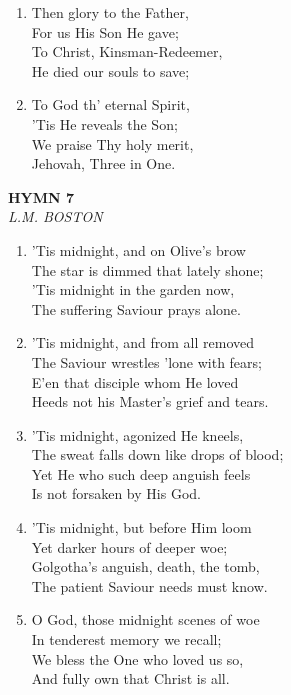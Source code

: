 \documentclass[11pt,a4paper]{article}
\begin{document}
\begin{enumerate}
    \item Then glory to the Father, \\
        For us His Son He gave; \\
        To Christ, Kinsman-Redeemer, \\
        He died our souls to save;

    \item To God th' eternal Spirit, \\
        'Tis He reveals the Son; \\
        We praise Thy holy merit, \\
        Jehovah, Three in One.

\end{enumerate}

\newpage
\begin{center}
    {\Large \textbf{HYMN 7}}
    \\
    \textit{L.M. BOSTON}
\end{center}
\vspace{1em}

\begin{enumerate}
    \item 'Tis midnight, and on Olive's brow \\
        The star is dimmed that lately shone; \\
        'Tis midnight in the garden now, \\
        The suffering Saviour prays alone.

    \item 'Tis midnight, and from all removed \\
        The Saviour wrestles 'lone with fears; \\
        E'en that disciple whom He loved \\
        Heeds not his Master's grief and tears.

    \item 'Tis midnight, agonized He kneels, \\
        The sweat falls down like drops of blood; \\
        Yet He who such deep anguish feels \\
        Is not forsaken by His God.

    \item 'Tis midnight, but before Him loom \\
        Yet darker hours of deeper woe; \\
        Golgotha's anguish, death, the tomb, \\
        The patient Saviour needs must know.

    \item O God, those midnight scenes of woe \\
        In tenderest memory we recall; \\
        We bless the One who loved us so, \\
        And fully own that Christ is all.

\end{enumerate}
\end{document}
